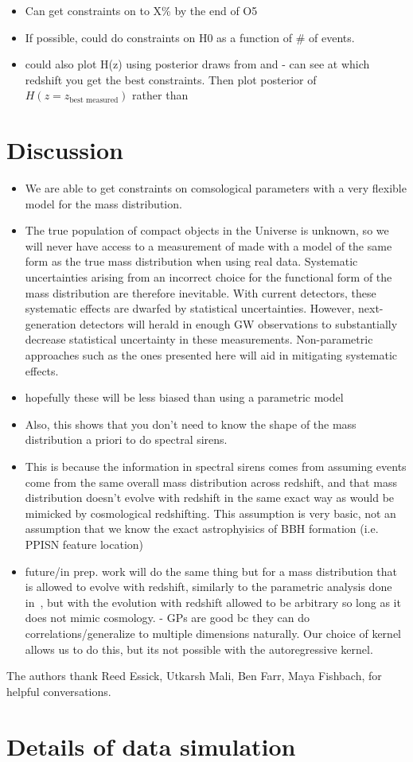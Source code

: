 \documentclass[]{aastex631}
\begin{document}
\begin{itemize}
    \item Can get constraints on \Ho{} to X\% by the end of O5
    \item If possible, could do constraints on H0 as a function of \# of events.
    \item could also plot H(z) using posterior draws from \Ho{} and \Omm{}- can see at which redshift you get the best constraints. Then plot posterior of $H(z=z_{\text{best measured}})$ rather than \Ho
\end{itemize}
\section{Discussion}
\label{sec:discussion}


\begin{itemize}
    \item We are able to get constraints on comsological parameters with a very flexible model for the mass distribution. 
    \item The true population of compact objects in the Universe is unknown, so we will never have access to a measurement of \Ho{} made with a model of the same form as the true mass distribution when using real data.
Systematic uncertainties arising from an incorrect choice for the functional form of the mass distribution are therefore inevitable.
With current detectors, these systematic effects are dwarfed by statistical uncertainties.
However, next-generation detectors will herald in enough GW observations to substantially decrease statistical uncertainty in these measurements.
Non-parametric approaches such as the ones presented here will aid in mitigating systematic effects.
    \item hopefully these will be less biased than using a parametric model
    \item Also, this shows that you don't need to know the shape of the mass distribution a priori to do spectral sirens.
    \item This is because the information in spectral sirens comes from assuming events come from the same overall mass distribution across redshift, and that mass distribution doesn't evolve with redshift in the same exact way as would be mimicked by cosmological redshifting. This assumption is very basic, not an assumption that we know the exact astrophyisics of BBH formation (i.e. PPISN feature location)
    \item future/in prep. work will do the same thing but for a mass distribution that is allowed to evolve with redshift, similarly to the parametric analysis done in~\cite{ezquiaga_spectral_2022}, but with the evolution with redshift allowed to be arbitrary so long as it does not mimic cosmology. - GPs are good bc they can do correlations/generalize to multiple dimensions naturally. Our choice of kernel allows us to do this, but its not possible with the autoregressive kernel.
\end{itemize}
\begin{acknowledgments}
    The authors thank Reed Essick, Utkarsh Mali, Ben Farr, Maya Fishbach,  for helpful conversations.
\end{acknowledgments}


\appendix
\section{Details of data simulation}
\end{document}
